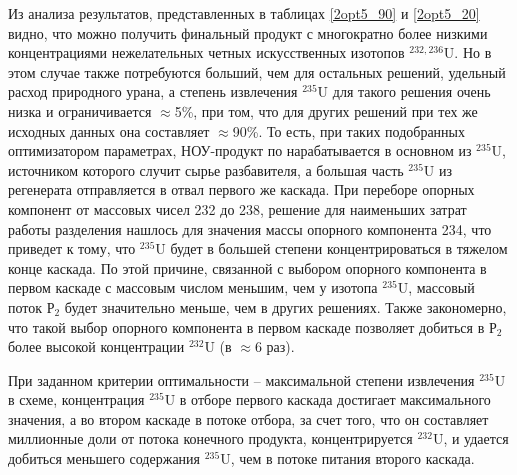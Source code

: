 Из анализа результатов, представленных в таблицах \ref{2opt5_90} и \ref{2opt5_20} видно, что можно получить финальный продукт с многократно более низкими концентрациями нежелательных четных искусственных  изотопов $^{232,236}$U. Но в этом случае также потребуются больший, чем для остальных решений, удельный расход природного урана, а степень извлечения $^{235}$U для такого решения очень низка и ограничивается $\approx$5\%, при том, что для других решений при тех же исходных данных она составляет $\approx$90\%. То есть, при таких подобранных оптимизатором параметрах, НОУ-продукт по нарабатывается в основном из $^{235}$U, источником которого случит сырье разбавителя, а большая часть $^{235}$U из регенерата отправляется в отвал первого же каскада. При переборе опорных компонент от массовых чисел 232 до 238, решение для наименьших затрат работы разделения нашлось для значения массы опорного компонента 234, что приведет к тому, что $^{235}$U будет в большей степени концентрироваться в тяжелом конце каскада. По этой причине, связанной с выбором опорного компонента в первом каскаде с массовым числом меньшим, чем у изотопа $^{235}$U, массовый поток $Р_2$ будет значительно меньше, чем в других решениях. Также закономерно, что такой выбор опорного компонента в первом каскаде позволяет добиться в $Р_2$ более высокой концентрации $^{232}$U (в $\approx$6 раз).


При заданном критерии оптимальности -- максимальной степени извлечения $^{235}$U в схеме, концентрация $^{235}$U в отборе первого каскада достигает максимального значения, а во втором каскаде в потоке отбора, за счет того, что он составляет миллионные доли от потока конечного продукта, концентрируется $^{232}$U, и удается добиться меньшего содержания $^{235}$U, чем в потоке питания второго каскада.



